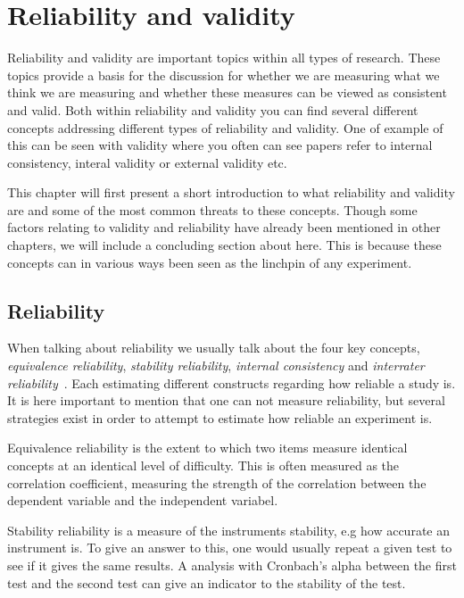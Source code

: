 \section{Reliability and validity}\label{sec:reliabilityLiterature}
Reliability and validity are important topics within all types of research. 
These topics provide a basis for the discussion for whether we are measuring what we think we are measuring and whether these measures can be viewed as consistent and valid. 
Both within reliability and validity you can find several different concepts addressing different types of reliability and validity. 
One of example of this can be seen with validity where you often can see papers refer to internal consistency, interal validity or external validity etc.

\bigskip\noindent
This chapter will first present a short introduction to what reliability and validity are and some of the most common threats to these concepts.  
Though some factors relating to validity and reliability have already been mentioned in other chapters, 
we will include a concluding section about here. 
This is because these concepts can in various ways been seen as the linchpin of any experiment.

\subsection*{Reliability}
	When talking about reliability we usually talk about the four key concepts, \textit{equivalence reliability}, \textit{stability reliability}, \textit{internal consistency} and  \textit{interrater reliability}~\cite{colostateReliability,laerdReliability}. 
	Each estimating different constructs regarding how reliable a study is. 
	It is here important to mention that one can not measure reliability, but several strategies exist in order to attempt to estimate how reliable an experiment is.
	
	\bigskip\noindent
	Equivalence reliability is the extent to which two items measure identical concepts at an identical level of difficulty. This is often measured as the correlation coefficient, measuring the strength of the correlation between the dependent variable and the independent variabel. 
	
	\bigskip\noindent
	Stability reliability is a measure of the instruments stability, e.g how accurate an instrument is. To give an answer to this, one would usually repeat a given test to see if it gives the same results. A analysis with Cronbach's alpha between the first test and the second test can give an indicator to the stability of the test.
	
